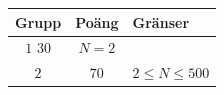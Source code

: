 
\begin{center}
\begin{tabular}{| c | c | l |}
  \hline
  \textbf{Grupp} & \textbf{Poäng} & \textbf{Gränser} \\ \hline
  $1$     $30$  & $N = 2$ \\ \hline
  $2$    & $70$  & $2 \leq N \leq 500$ \\ \hline
\end{tabular}
\end{center}

